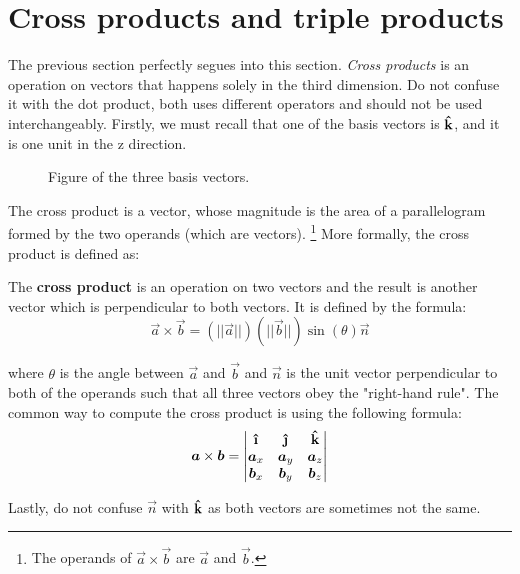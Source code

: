 
\section{Cross products and triple products}
The previous section perfectly segues into this section. \emph{Cross products} is an operation on vectors that happens solely in the third dimension. Do not confuse it with the dot product, both uses different operators and should not be used interchangeably. Firstly, we must recall that one of the basis vectors is \(\boldsymbol{\hat{\textbf{k}}}\), and it is one unit in the z direction.
\begin{figure}
  \centering
  \caption{Figure of the three basis vectors.}
\end{figure}


The cross product is a vector, whose magnitude is the area of a parallelogram formed by the two operands (which are vectors). \footnote{The operands of \(\vec{a}\times\vec{b}\) are \(\vec{a}\) and \(\vec{b}\).} More formally, the cross product is defined as:
\begin{definition}
  The \textbf{cross product} is an operation on two vectors and the result is another vector which is perpendicular to both vectors. It is defined by the formula:
  \begin{equation*}
    \vec{a}\times\vec{b} = (||\vec{a}||)(||\vec{b}||)\sin(\theta)\vec{n}
  \end{equation*}


  where \(\theta\) is the angle between \(\vec{a}\) and \(\vec{b}\) and \(\vec{n}\) is the unit vector perpendicular to both of the operands such that all three vectors obey the "right-hand rule"\footnotemark. The common way to compute the cross product is using the following formula:
  \begin{equation}
    \vec{a}\times\vec{b} = \begin{vmatrix}
      \ihat & \jhat & \khat \\
      \vec{a}_x & \vec{a}_y & \vec{a}_z \\
      \vec{b}_x & \vec{b}_y & \vec{b}_z \\
    \end{vmatrix}
  \end{equation}


  Lastly, do not confuse \(\vec{n}\) with \(\boldsymbol{\hat{\textbf{k}}}\) as both vectors are sometimes not the same.
\end{definition}

